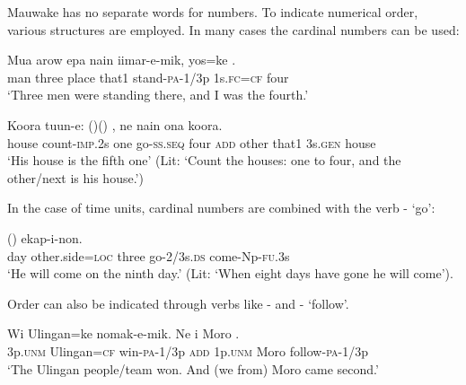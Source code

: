 Mauwake has no separate words for  numbers. To indicate numerical order, various structures are employed. In many cases the cardinal numbers can be used:

\ea%
\label{ex:3:x96}
\gll Mua arow epa nain iimar-e-mik, yos=ke . \\
man three place that1 stand-\textsc{pa}-1/3p 1s.\textsc{fc}=\textsc{cf} four\\
\glt`Three men were standing there, and I was the fourth.'
\z

\ea%
\label{ex:3:x428}
\gll Koora tuun-e:  ()\textstyleEmphasizedVernacularWords{-}() , ne   nain ona koora.\\
house count-\textsc{imp}.2s one go-\textsc{ss}.\textsc{seq} four \textsc{add} other that1 3s.\textsc{gen} house\\
\glt`His house is the fifth one' (Lit: `Count the houses: one to four, and the other/next is his house.')
\z

In the case of time units, cardinal numbers are combined with the verb - `go':

\ea%
\label{ex:3:x427}
\gll {} ()   ekap-i-non. \\
day other.side=\textsc{loc} three go-2/3s.\textsc{ds} come-Np-\textsc{fu}.3s\\
\glt`He will come on the ninth day.' (Lit: `When eight days have gone he will come').
\z

Order can also be indicated through verbs like - and - `follow'. 

\ea%
\label{ex:3:x98}
\gll Wi Ulingan=ke nomak-e-mik. Ne i Moro .\\
3p.\textsc{unm} Ulingan=\textsc{cf} win-\textsc{pa}-1/3p \textsc{add} 1p.\textsc{unm} Moro follow-\textsc{pa}-1/3p\\
\glt`The Ulingan people/team won. And (we from) Moro came second.'
\z


